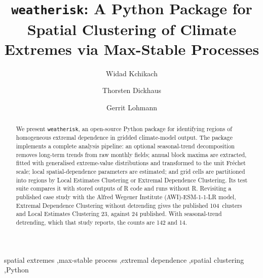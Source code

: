 \documentclass[preprint,12pt,a4paper]{elsarticle}
\newcommand{\revn}[1]{{#1}}
\newcommand{\revt}[1]{{#1}}
\begin{document}
\begin{frontmatter}

\title{\texttt{weatherisk}: A Python Package for Spatial Clustering
  of Climate Extremes via Max-Stable Processes}

\author[awi,stat]{Widad Kchikach}

\author[stat]{Thorsten Dickhaus}
\author[awi,phys]{Gerrit Lohmann}

\address[awi]{Alfred Wegener Institute Helmholtz Centre for Polar
  and Marine Research, Am Handelshafen 12, 27570 Bremerhaven, Germany}
\address[stat]{Institute for Statistics, Faculty of Mathematics and
  Computer Science, University of Bremen, Bibliothekstra\ss{}e 5,
  28359 Bremen, Germany}
\address[phys]{Faculty of Physics and Electrical Engineering,
  University of Bremen, Otto-Hahn-Allee 1, 28359 Bremen, Germany}


\begin{abstract}
We present \texttt{weatherisk}, an open-source Python package for
identifying regions of homogeneous extremal dependence in gridded
climate-model output. The package implements a
complete analysis pipeline: an optional \revt{seasonal-trend decomposition}
removes long-term trends from raw monthly fields; annual block maxima are
extracted, fitted with \revt{generalised extreme-value}
distributions and transformed to the unit Fr\'{e}chet scale; local
spatial-dependence parameters are estimated; and grid cells are
partitioned into regions by Local Estimates Clustering or
Extremal Dependence Clustering. Its test suite compares it with
stored outputs of R code and runs without R. \revn{Revisiting a published
case study with the} \revt{Alfred Wegener Institute (AWI)}-ESM-1-1-LR
model, \revn{Extremal Dependence Clustering without detrending gives
the published 104~clusters and Local Estimates Clustering 23, against
24 published.} With seasonal-trend detrending, which that study
reports, the counts are 142 and 14.
\end{abstract}


\begin{keyword}
\revt{spatial extremes \sep max-stable process \sep extremal dependence \sep spatial clustering \sep Python}
\end{keyword}

\end{frontmatter}
\end{document}
